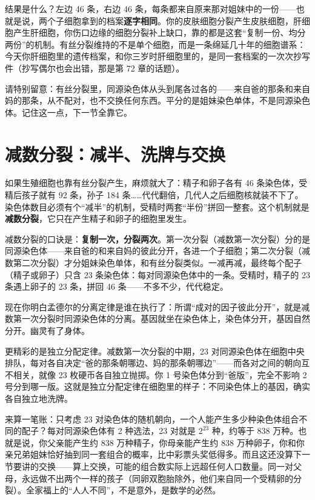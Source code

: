 结果是什么？左边 46 条，右边 46 条，每条都来自原来那对姐妹中的一份——也就是说，两个子细胞拿到的档案\textbf{逐字相同}。你的皮肤细胞分裂产生皮肤细胞，肝细胞产生肝细胞，你伤口边缘的细胞分裂补上缺口，靠的都是这套“复制一份、均分两份”的机制。有丝分裂维持的不是单个细胞，而是一条绵延几十年的细胞谱系：今天你肝细胞里的遗传档案，和你三岁时肝细胞里的，是同一套档案的一次次抄写件（抄写偶尔也会出错，那是第 72 章的话题）。

请特别留意：有丝分裂里，同源染色体从头到尾各过各的——来自爸的那条和来自妈的那条，从不配对，也不交换任何东西。平分的是姐妹染色单体，不是同源染色体。记住这一点，下一节全靠它。

\section{减数分裂：减半、洗牌与交换}

如果生殖细胞也靠有丝分裂产生，麻烦就大了：精子和卵子各有 46 条染色体，受精后孩子就有 92 条，孙子 184 条……代代翻倍，几代人之后细胞核就装不下了。染色体数目必须有个“减半”的机制，受精时两套“半份”拼回一整套。这个机制就是\textbf{减数分裂}，它只在产生精子和卵子的细胞里发生。

减数分裂的口诀是：\textbf{复制一次，分裂两次}。第一次分裂（减数第一次分裂）分的是同源染色体——来自爸的和来自妈的彼此分开，各进一个子细胞；第二次分裂（减数第二次分裂）才分姐妹染色单体，和有丝分裂类似。一减再减，最终每个配子（精子或卵子）只含 23 条染色体：每对同源染色体中的一条。受精时，精子的 23 条遇上卵子的 23 条，拼回 46 条——不多不少，代代稳定。

现在你明白孟德尔的分离定律是谁在执行了：所谓“成对的因子彼此分开”，就是减数第一次分裂时同源染色体的分离。基因就坐在染色体上，染色体分开，基因自然分开。幽灵有了身体。

更精彩的是独立分配定律。减数第一次分裂的中期，23 对同源染色体在细胞中央排队，每对各自决定“爸的那条朝哪边、妈的那条朝哪边”——而各对之间的朝向互不相关，就像 23 枚硬币各自独立抛掷。你 1 号染色体分到“爸版”，完全不影响 2 号分到哪一版。这就是独立分配定律在细胞里的样子：不同染色体上的基因，确实各自独立地洗牌。

\begin{qiaoliang}
来算一笔账：只考虑 23 对染色体的随机朝向，一个人能产生多少种染色体组合不同的配子？每对同源染色体有 2 种选法，23 对就是 $2^{23}$ 种，约等于 838 万种。也就是说，你父亲能产生约 838 万种精子，你母亲能产生约 838 万种卵子，你和你亲兄弟姐妹恰好抽到同一套组合的概率，比中彩票头奖低得多。而且这还没算下一节要讲的交换——算上交换，可能的组合数实际上远超任何人口数量。同一对父母，永远做不出两个一样的孩子（同卵双胞胎除外，他们来自同一个受精卵的分裂）。全家福上的“人人不同”，不是意外，是数学的必然。
\end{qiaoliang}

